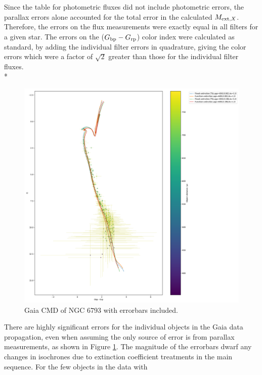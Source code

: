 \documentclass[12pt, a4paper]{report}
\begin{document}
Since the table for photometric fluxes did not include photometric errors, the parallax errors alone accounted for the total error in the calculated $M_{\textnormal{ext},X}$. Therefore, the errors on the flux measurements  were exactly equal in all filters for a given star. The errors on the ($G_{\textnormal{bp}}-G_{\textnormal{rp}}$) color index were calculated as standard, by adding the individual filter errors in quadrature, giving the color errors which were a factor of $\sqrt{2}$ greater than those for the individual filter fluxes.\\*

\begin{figure}[h]
\begin{center}
\includegraphics[scale=0.3]{../NGC_6793_CMD_FeH_0p002_0p198_Av_1p0_600Myr_isochrones_both_errorbars_T5k.pdf}
\caption{Gaia CMD of NGC 6793 with errorbars included.}
\label{ngc_errorbars}
\end{center}
\end{figure}

There are highly significant errors for the individual objects in the Gaia data propagation, even when assuming the only source of error is from  parallax measurements, as shown in Figure \ref{ngc_errorbars}. The magnitude of the errorbars dwarf any changes in isochrones due to extinction coefficient treatments in the main sequence. For the few objects in the data with 
\end{document}

